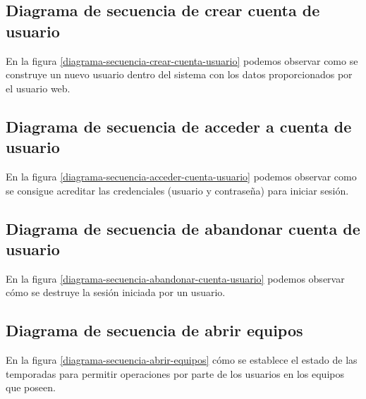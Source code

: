 \subsection*{Diagrama de secuencia de crear cuenta de usuario}

En la figura \ref{diagrama-secuencia-crear-cuenta-usuario} podemos observar como
se construye un nuevo usuario dentro del sistema con los datos proporcionados
por el usuario web.

\newpage

\subsection*{Diagrama de secuencia de acceder a cuenta de usuario}

En la figura \ref{diagrama-secuencia-acceder-cuenta-usuario} podemos observar
como se consigue acreditar las credenciales (usuario y contraseña) para iniciar
sesión.

\newpage

\subsection*{Diagrama de secuencia de abandonar cuenta de usuario}

En la figura \ref{diagrama-secuencia-abandonar-cuenta-usuario} podemos observar
cómo se destruye la sesión iniciada por un usuario.

\newpage

\subsection*{Diagrama de secuencia de abrir equipos}

En la figura \ref{diagrama-secuencia-abrir-equipos} cómo se establece el estado
de las temporadas para permitir operaciones por parte de los usuarios en los
equipos que poseen.


